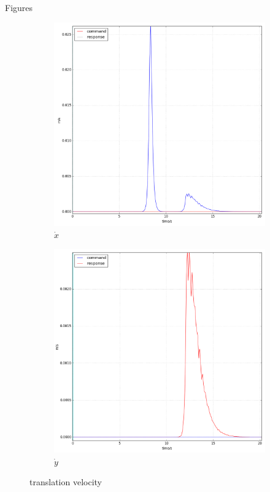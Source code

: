 \documentclass[10pt]{beamer}
\begin{document}
\begin{frame}{Figures}
    \begin{figure}
     \centering
     \begin{subfigure}[b]{0.49\textwidth}
         \centering
          \includegraphics[width=1.2\textwidth]{Figure/PR_x.png}
         \caption{$\dot{x}$}
         \label{fig:PRtranslationX}
     \end{subfigure}
     \hfill
     \begin{subfigure}[b]{0.49\textwidth}
         \centering
         \includegraphics[width=1.2\textwidth]{Figure/PR_y.png}
         \caption{$\dot{y}$}
         \label{fig:PRtranslationY}
     \end{subfigure}
     
        \caption{translation velocity}
        \label{fig:PRtranslation}
\end{figure}
\end{frame}
\end{document}
